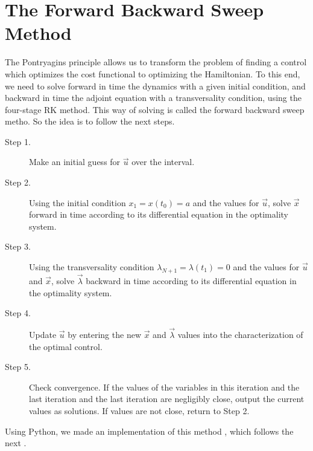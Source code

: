 \section{The Forward Backward Sweep Method}
    The Pontryagins principle allows us to transform the problem of finding a
    control which optimizes the cost functional to optimizing the Hamiltonian. 
    To this end, we need to solve forward in time the dynamics with a given 
    initial condition, and backward in time the adjoint equation with a 
    transversality condition, using the four-stage  RK method. This way of
    solving is called the forward backward sweep metho. So the idea is to 
    follow the next steps.
    
    \begin{description}
    	\item[Step 1.]
        	Make an initial guess for $\vec{u}$ over the interval.
        \item[Step 2.]
        	Using the initial condition $x_1 = x(t_0) = a$ and the values for 
            $\vec{u}$, solve $\vec{x}$ forward in time according to its differential
            equation in the optimality system.
    	\item[Step 3.]
        	Using the transversality condition $\lambda_{N+1} = \lambda(t_1) = 0$ 
            and the values for $\vec{u}$ and $\vec{x}$, solve $\vec{\lambda}$ 
            backward in time according to its differential equation in the optimality
            system.
        \item[Step 4.]
        	Update $\vec{u}$ by entering the new $\vec{x}$ and $\vec{\lambda}$ values 
            into the characterization of the optimal control. 
    	\item[Step 5.]
        	Check convergence. If the values of the variables in this iteration and 
            the last iteration and the last iteration are negligibly close, output the 
            current values as solutions. If values are not close, return to Step 2.
    \end{description}

    Using Python, we made an implementation of this method \citep{python_Thesisrepo},
    which follows the next  . 

